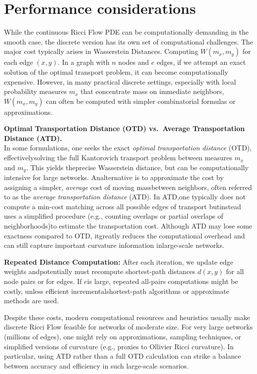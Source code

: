 
\section{Performance considerations}
\label{sec:ricci_flow_networks_performance}

While the continuous Ricci Flow PDE can be computationally demanding in the smooth case, the discrete version has its own set of computational challenges. The major cost typically arises in Wasserstein Distances. Computing $W(m_x, m_y)$ for each edge $(x,y)$. In a graph with $n$ nodes and $e$ edges, if we attempt an exact solution of the optimal transport problem, it can become computationally expensive. However, in many practical discrete settings, especially with local probability measures $m_x$ that concentrate mass on immediate neighbors, $W(m_x,m_y)$ can often be computed with simpler combinatorial formulas or approximations. 

\textbf{Optimal Transportation Distance (OTD) vs.\ Average Transportation Distance (ATD).}
\\
In some formulations, one seeks the exact \emph{optimal transportation distance} (OTD), effectivelysolving the full Kantorovich transport problem between measures $m_x$ and $m_y$. This yields theprecise Wasserstein distance, but can be computationally intensive for large networks. Analternative is to approximate the cost by assigning a simpler, \emph{average} cost of moving massbetween neighbors, often referred to as the \emph{average transportation distance} (ATD). In ATD,one typically does not compute a min-cost matching across all possible edges of transport butinstead uses a simplified procedure (e.g., counting overlaps or partial overlaps of neighborhoods)to estimate the transportation cost. Although ATD may lose some exactness compared to OTD, itgreatly reduces the computational overhead and can still capture important curvature information inlarge-scale networks.

\color{red}
\textbf{Repeated Distance Computation:} After each iteration, we update edge weights andpotentially must recompute shortest-path distances $d(x,y)$ for all node pairs or for edges. If $e$is large, repeated all-pairs computations might be costly, unless efficient incrementalshortest-path algorithms or approximate methods are used.
\color{black}


Despite these costs, modern computational resources and heuristics usually make discrete Ricci Flow feasible for networks of moderate size. For very large networks (millions of edges), one might rely on approximations, sampling techniques, or simplified versions of curvature (e.g., proxies to Ollivier Ricci curvature). In particular, using ATD rather than a full OTD calculation can strike a balance between accuracy and efficiency in such large-scale scenarios.



